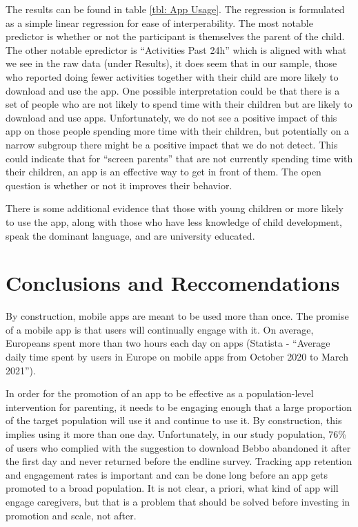 \documentclass{article}
\begin{document}
The results can be found in table \ref{tbl: App Usage}. The regression is formulated as a simple linear regression for ease of interperability. The most notable predictor is whether or not the participant is themselves the parent of the child. The other notable epredictor is ``Activities Past 24h'' which is aligned with what we see in the raw data (under Results), it does seem that in our sample, those who reported doing fewer activities together with their child are more likely to download and use the app. One possible interpretation could be that there is a set of people who are not likely to spend time with their children but are likely to download and use apps. Unfortunately, we do not see a positive impact of this app on those people spending more time with their children, but potentially on a narrow subgroup there might be a positive impact that we do not detect. This could indicate that for ``screen parents'' that are not currently spending time with their children, an app is an effective way to get in front of them. The open question is whether or not it improves their behavior.

There is some additional evidence that those with young children or more likely to use the app, along with those who have less knowledge of child development, speak the dominant language, and are university educated.



\section{Conclusions and Reccomendations}

By construction, mobile apps are meant to be used more than once. The promise of a mobile app is that users will continually engage with it. On average, Europeans spent more than two hours each day on apps (Statista - ``Average daily time spent by users in Europe on mobile apps from October 2020 to March 2021'').

In order for the promotion of an app to be effective as a population-level intervention for parenting, it needs to be engaging enough that a large proportion of the target population will use it and continue to use it. By construction, this implies using it more than one day. Unfortunately, in our study population, 76\% of users who complied with the suggestion to download Bebbo abandoned it after the first day and never returned before the endline survey. Tracking app retention and engagement rates is important and can be done long before an app gets promoted to a broad population. It is not clear, a priori, what kind of app will engage caregivers, but that is a problem that should be solved before investing in promotion and scale, not after.
\end{document}
